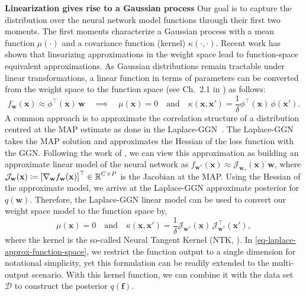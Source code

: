 \documentclass{article}
\newcommand{\dataset}{\ensuremath{\mathcal{D}}}
\newcommand{\weights}{\ensuremath{\mathbf{w}}}
\newcommand{\mbf}[1]{\mathbf{#1}}
\newcommand{\T}{\top}
\newcommand{\vf}{\mbf{f}}
\newcommand{\vx}{\mbf{x}}
\newcommand{\vw}{\mbf{w}}
\newcommand{\Jac}[2]{\mathcal{J}_{#1}(#2)}
\newcommand{\JacT}[2]{\mathcal{J}_{#1}^\top(#2)}
\newcommand{\GP}{\mathcal{GP}}
\begin{document}
\textbf{Linearization gives rise to a Gaussian process}
Our goal is to capture the distribution over the neural network model functions through their first two moments. The first moments characterize a Gaussian process with a mean function $\mu(\cdot)$ and a covariance function (kernel) $\kappa(\cdot,\cdot)$. 
Recent work \cite{khan2019approximate,maddox2021fast} has shown that linearizing approximations in the weight space lead to function-space equivalent approximations.
As Gaussian distributions remain tractable under linear transformations, a linear function in terms of parameters can be converted from the weight space to the function space (see Ch.~2.1 in \cite{rasmussen2006gaussian}) as follows:
%
\begin{equation} \label{eq:weight_func}
f_\weights(\vx) \approx 
\phi^\top\!(\vx) \, \vw \quad\implies\quad \mu(\vx) = 0 \quad \text{and} \quad \kappa(\vx, \vx') = \frac{1}{\delta} \phi^\T\!(\vx) \, \phi(\vx').
\end{equation}
A common approach is to approximate the correlation structure of a distribution centred at the MAP estimate as done in the Laplace-GGN~\cite{khan2019approximate, daxberger2021laplace, maddox2021fast}. 
The Laplace-GGN takes the MAP solution and approximates the Hessian of the loss function
with the GGN.
Following the work of \citet{khan2019approximate}, we can view this approximation as building an approximate linear model of the neural network as $f_{\weights^*}(\vx) \approx 
\Jac{\weights_*}{\vx} \, \weights$, where $\Jac{\weights}{\vx} \coloneqq \left[ \nabla_\weights f_\weights(\vx)\right]^\top \in \R^{C \times P}$ is the Jacobian at the MAP.
Using the Hessian of the approximate model, we arrive at the Laplace-GGN approximate posterior for $q(\vw)$. 
Therefore, the Laplace-GGN linear model can be used to convert our weight space model to the function space by,
\begin{equation} 
\label{eq-laplace-approx-function-space} 
  \mu(\vx) =  0 \quad \text{and} \quad
  \kappa(\vx, \vx')
  = \frac{1}{\delta} \Jac{\weights^*}{\vx} \, \JacT{\weights^*}{\vx'}, 
\end{equation}
where the kernel is the so-called Neural Tangent Kernel (NTK, \cite{jacot2018neural}). In \cref{eq-laplace-approx-function-space}, we restrict the function output to a single dimension for notational simplicity, yet this formulation can be readily extended to the multi-output scenario. With this kernel function, we can combine it with the data set $\dataset$ to construct the posterior $q(\vf)$. 
\end{document}
